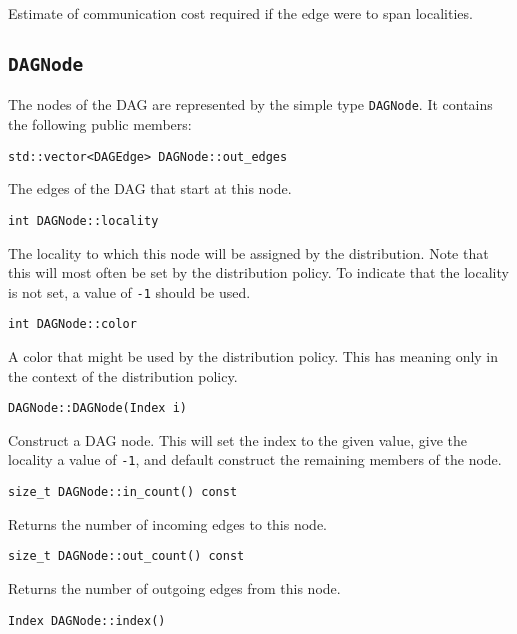 \noindent Estimate of communication cost required if the edge were to span
localities.


\subsection{\texttt{DAGNode}}

The nodes of the DAG are represented by the simple type \texttt{DAGNode}. It
contains the following public members:

\begin{lstlisting}
std::vector<DAGEdge> DAGNode::out_edges
\end{lstlisting}

\noindent The edges of the DAG that start at this node.

\begin{lstlisting}
int DAGNode::locality
\end{lstlisting}

\noindent The locality to which this node will be assigned by the
distribution. Note that this will most often be set by the distribution policy.
To indicate that the locality is not set, a value of \texttt{-1} should be used.

\begin{lstlisting}
int DAGNode::color
\end{lstlisting}

\noindent A color that might be used by the distribution policy. This has
meaning only in the context of the distribution policy.

\begin{lstlisting}
DAGNode::DAGNode(Index i)
\end{lstlisting}

\noindent Construct a DAG node. This will set the index to the given value,
give the locality a value of \texttt{-1}, and default construct the remaining
members of the node.

\begin{lstlisting}
size_t DAGNode::in_count() const
\end{lstlisting}

\noindent Returns the number of incoming edges to this node.

\begin{lstlisting}
size_t DAGNode::out_count() const
\end{lstlisting}

\noindent Returns the number of outgoing edges from this node.

\begin{lstlisting}
Index DAGNode::index()
\end{lstlisting}

